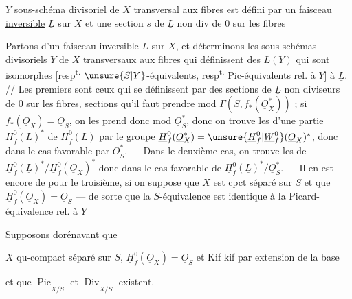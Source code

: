 $Y$ sous-schéma divisoriel de $X$ transversal aux fibres est défini par un \uline{faisceau inversible} $\underline L$ sur $X$ et une section $s$ de $\underline L$  non div de $0$ sur les fibres

Partons d'un faisceau inversible $\underline L$ sur $X$, et déterminons les  sous-schémas divisoriels $Y$ de $X$ transversaux aux fibres qui définissent des $\underline L(Y)$  qui sont   isomorphes [resp\textsuperscript{t.} $\unsure{S|Y}$-équivalents, resp\textsuperscript{t.}  Pic-équivalents rel. à $Y$] à $\underline L$. // Les premiers sont ceux qui se définissent par des sections de $\underline L$ non diviseurs de $0$ sur les fibres, sections qu'il faut prendre mod $\Gamma(S,f_*(\underline O_X^*))$ ; si $f_*(\underline O_X)=\underline O_S$, on les prend donc mod $\underline O_S^*$, donc on trouve les   d'une  partie $\underline H^0_f(\underline L)^*$ de $\underline H_f^0(\underline L)$ par le groupe $\underline H^0_f(\underline O_X^*)=\unsure{\underline H_f^0|\underline W_f^0}(\underline O_X)^*$, donc dans le cas favorable par $\underline O_S^*$. --- Dans le deuxième cas, on trouve les  de $\underline H^0_f(\underline L)^*/\underline H_f^0(\underline O_X)^*$ donc dans le cas favorable de $\underline H^0_f(\underline L)^*/\underline O_S^*$. ---
Il en est encore de  pour le troisième, si on suppose que $X$ est  cpct séparé sur $S$ et que $\underline H_f^0(\underline O_X)=\underline O_S$ --- de sorte que la $S$-équivalence est identique à la Picard-équivalence rel. à $Y$

Supposons dorénavant que

$X$ qu-compact séparé sur $S$, $\underline H_f^0(\underline O_X)=\underline O_S$ et Kif kif par extension de la base

et que $\underline{\underline{\operatorname{Pic}}}_{X/S}$ et $\underline{\underline{\operatorname{Div}}}_{X/S}$ existent.

